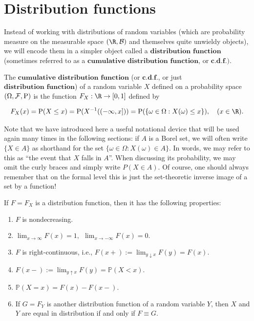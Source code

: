 \section{Distribution functions}
\label{sec:dist-funs}

Instead of working with distributions of random
variables (which are probability measure on the
measurable space $(\R, {\cal B})$ and themselves
quite unwieldy objects), we will encode them in a
simpler object called a
$\textbf{distribution function}$ (sometimes referred
to as a $\textbf{cumulative distribution function}$,
or $\textbf{c.d.f.})$.

\begin{defn}
The $\textbf{cumulative distribution function}$ (or
$\textbf{c.d.f.}$, or just
$\textbf{distribution function}$) of a random
variable $X$ defined on a probability space
$(\Omega, {\cal F}, \mathrm{P})$ is the function
$F_X:\R \to [0,1]$ defined by

\[
F_X(x) = \mathrm{P}( X \le x ) = \mathrm{P}( X^{-1}((-\infty,x])) = \mathrm{P}( \{ \omega \in \Omega : X(\omega) \le x \} ),
\quad (x\in \R).
\]

\end{defn}

\noindent Note that we have introduced here a useful notational
device that will be used again many times in the
following sections: if $A$ is a Borel set, we will
often write $\{X \in A\}$ as shorthand for the set
$\{ \omega \in \Omega : X(\omega) \in A \}$. In
words, we may refer to this as ``the event that $X$
falls in $A$''. When discussing its probability, we
may omit the curly braces and simply write
$P(X\in A)$. Of course, one should always remember
that on the formal level this is just the
set-theoretic inverse image of a set by a function!

\begin{thm}
If $F=F_X$ is a distribution function, then it has
the following properties:

\begin{enumerate}[label=(\roman*)]
\item $F$ is nondecreasing.

\item $\lim_{x\to\infty} F(x) = 1, \ \ \lim_{x\to-\infty}
F(x) = 0$.

\item $F$ is right-continuous, i.e.,
$F(x+) := \lim_{y\downarrow x} F(y) = F(x).$

\item $F(x-) := \lim_{y\uparrow x} F(y) = \mathbb{P}(X <
x)$.

\item $\mathbb{P}(X=x) = F(x) - F(x-)$.

\item If $G=F_Y$ is another distribution function of a
random variable $Y$, then $X$ and $Y$ are equal in
distribution if and only if $F \equiv G$.
\end{enumerate}

\end{thm}


